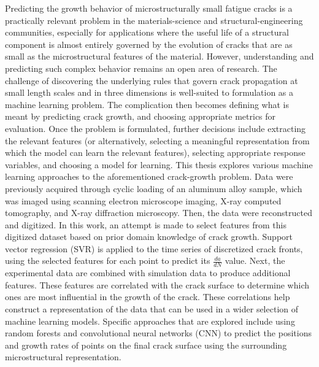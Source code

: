 
Predicting the growth behavior of microstructurally small fatigue cracks is a practically relevant problem in the materials-science and structural-engineering communities, especially for applications where the useful life of a structural component is almost entirely governed by the evolution of cracks that are as small as the microstructural features of the material.  However, understanding and predicting such complex behavior remains an open area of research.  The challenge of discovering the underlying rules that govern crack propagation at small length scales and in three dimensions is well-suited to formulation as a machine learning problem.  The complication then becomes defining what is meant by predicting crack growth, and choosing appropriate metrics for evaluation.  Once the problem is formulated, further decisions include extracting the relevant features (or alternatively, selecting a meaningful representation from which the model can learn the relevant features), selecting appropriate response variables, and choosing a model for learning.  This thesis explores various machine learning approaches to the aforementioned crack-growth problem.  Data were previously acquired through cyclic loading of an aluminum alloy sample, which was imaged using scanning electron microscope imaging, X-ray computed tomography, and X-ray diffraction microscopy.  Then, the data were reconstructed and digitized. In this work, an attempt is made to select features from this digitized dataset based on prior domain knowledge of crack growth.  Support vector regression (SVR) is applied to the time series of discretized crack fronts, using the selected features for each point to predict its $\frac{da}{dN}$ value.  Next, the experimental data are combined with simulation data to produce additional features.  These features are correlated with the crack surface to determine which ones are most influential in the growth of the crack.  These correlations help construct a representation of the data that can be used in a wider selection of machine learning models.  Specific approaches that are explored include using random forests and convolutional neural networks (CNN) to predict the positions and growth rates of points on the final crack surface using the surrounding microstructural representation.
